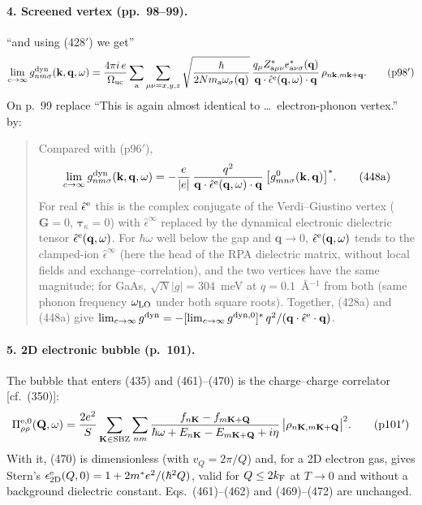 \paragraph{4. Screened vertex (pp.~98--99).}
``and using (428$'$) we get''
\begin{equation*}
\lim_{c\to\infty}g^{\rm dyn}_{nm\sigma}(\mathbf k,\mathbf q,\omega)=
\frac{4\pi i\,e}{\Omega_{\rm uc}}\sum_{\rm a}\sum_{\mu\nu=x,y,z}
\sqrt{\frac{\hbar}{2Nm_{\rm a}\omega_\sigma(\mathbf q)}}\,
\frac{q_\mu Z^*_{{\rm a}\mu\nu}e^*_{{\rm a}\nu\sigma}(\mathbf q)}{\mathbf q\cdot\hat\epsilon^{\rm e}(\mathbf q,\omega)\cdot\mathbf q}\,
\rho_{n\mathbf k,m\mathbf k+\mathbf q} .
\tag{p98$'$}
\end{equation*}
On p.~99 replace ``This is again almost identical to \ldots\ electron-phonon vertex.'' by:
\begin{quote}
Compared with (p96$'$),
\begin{equation*}
\lim_{c\to\infty}g^{\rm dyn}_{nm\sigma}(\mathbf k,\mathbf q,\omega)=-\frac{e}{|e|}\,
\frac{q^2}{\mathbf q\cdot\hat\epsilon^{\rm e}(\mathbf q,\omega)\cdot\mathbf q}\,
\big[g^0_{mn\sigma}(\mathbf k,\mathbf q)\big]^* .
\tag{448a}
\end{equation*}
For real $\hat\epsilon^{\rm e}$ this is the complex conjugate of the Verdi--Giustino vertex
($\mathbf G=0$, $\boldsymbol\tau_\kappa=0$) with $\hat\epsilon^\infty$ replaced by the dynamical
electronic dielectric tensor $\hat\epsilon^{\rm e}(\mathbf q,\omega)$. For $\hbar\omega$ well below the
gap and $\mathbf q\to0$, $\hat\epsilon^{\rm e}(\mathbf q,\omega)$ tends to the clamped-ion $\hat\epsilon^\infty$
(here the head of the RPA dielectric matrix, without local fields and exchange--correlation), and the
two vertices have the same magnitude; for GaAs, $\sqrt N|g|=304$~meV at $q=0.1$~\AA$^{-1}$ from both
(same phonon frequency $\omega_{\rm LO}$ under both square roots). Together, (428a) and (448a) give
$\lim_{c\to\infty}g^{\rm dyn}=-[\lim_{c\to\infty}g^{\rm dyn,0}]^*\,q^2/(\mathbf q\cdot\hat\epsilon^{\rm e}\cdot\mathbf q)$.
\end{quote}

\paragraph{5. 2D electronic bubble (p.~101).}
The bubble that enters (435) and (461)--(470) is the charge--charge correlator [cf.\ (350)]:
\begin{equation*}
\Pi^{\rm e,0}_{\rho\rho}(\mathbf Q,\omega)=\frac{2e^2}{S}\sum_{\mathbf K\in{\rm SBZ}}\sum_{nm}
\frac{f_{n\mathbf K}-f_{m\mathbf K+\mathbf Q}}{\hbar\omega+E_{n\mathbf K}-E_{m\mathbf K+\mathbf Q}+i\eta}\,
\big|\rho_{n\mathbf K,m\mathbf K+\mathbf Q}\big|^2 .
\tag{p101$'$}
\end{equation*}
With it, (470) is dimensionless (with $v_Q=2\pi/Q$) and, for a 2D electron gas, gives Stern's
$\epsilon^{\rm e}_{\rm 2D}(Q,0)=1+2m^*e^2/(\hbar^2Q)$, valid for $Q\le2k_{\rm F}$ at $T\to0$ and without
a background dielectric constant. Eqs.~(461)--(462) and (469)--(472) are unchanged.

